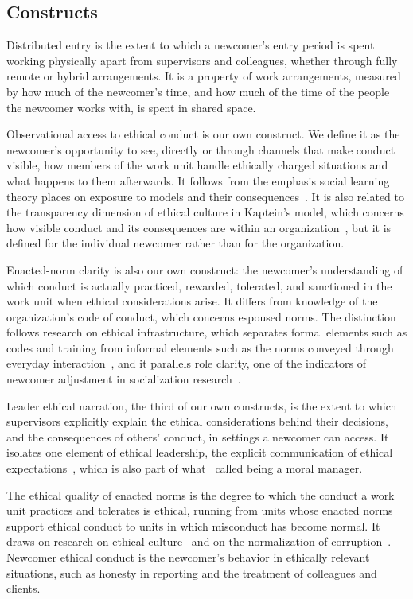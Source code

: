 \documentclass[12pt,a4paper]{article}
\theoremstyle{definition}
\begin{document}
\subsection{Constructs}

Distributed entry is the extent to which a newcomer's entry period is spent working physically apart from supervisors and colleagues, whether through fully remote or hybrid arrangements. It is a property of work arrangements, measured by how much of the newcomer's time, and how much of the time of the people the newcomer works with, is spent in shared space.

Observational access to ethical conduct is our own construct. We define it as the newcomer's opportunity to see, directly or through channels that make conduct visible, how members of the work unit handle ethically charged situations and what happens to them afterwards. It follows from the emphasis social learning theory places on exposure to models and their consequences~\citep{bandura1977social}. It is also related to the transparency dimension of ethical culture in Kaptein's model, which concerns how visible conduct and its consequences are within an organization~\citep{kaptein2008developing}, but it is defined for the individual newcomer rather than for the organization.

Enacted-norm clarity is also our own construct: the newcomer's understanding of which conduct is actually practiced, rewarded, tolerated, and sanctioned in the work unit when ethical considerations arise. It differs from knowledge of the organization's code of conduct, which concerns espoused norms. The distinction follows research on ethical infrastructure, which separates formal elements such as codes and training from informal elements such as the norms conveyed through everyday interaction~\citep{tenbrunsel2003building}, and it parallels role clarity, one of the indicators of newcomer adjustment in socialization research~\citep{bauer2007newcomer}.

Leader ethical narration, the third of our own constructs, is the extent to which supervisors explicitly explain the ethical considerations behind their decisions, and the consequences of others' conduct, in settings a newcomer can access. It isolates one element of ethical leadership, the explicit communication of ethical expectations~\citep{brown2005ethical}, which is also part of what~\citet{trevino2000moral} called being a moral manager.

The ethical quality of enacted norms is the degree to which the conduct a work unit practices and tolerates is ethical, running from units whose enacted norms support ethical conduct to units in which misconduct has become normal. It draws on research on ethical culture~\citep{trevino1998ethical,kaptein2008developing} and on the normalization of corruption~\citep{ashforth2003normalization}. Newcomer ethical conduct is the newcomer's behavior in ethically relevant situations, such as honesty in reporting and the treatment of colleagues and clients.
\end{document}
